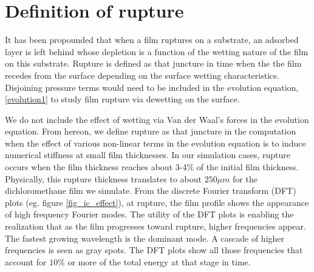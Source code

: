 \documentclass[a4paper,12pt]{article}
\begin{document}


\section{Definition of rupture}
It has been propounded that when a film ruptures on a substrate, an adsorbed layer is left behind whose depletion is a function of the wetting nature\citep{Oron2001a} of the film on this substrate. Rupture is defined as that juncture in time when the the film recedes from the surface depending on the surface wetting characteristics. Disjoining pressure terms would need to be included in the evolution equation, \ref{evolution1} to study film rupture via dewetting on the surface.

We do not include the effect of wetting via Van der Waal's forces in the evolution equation. From hereon, we define rupture as that juncture in the computation when the effect of various non-linear terms in the evolution equation is to induce numerical stiffness at small film thicknesses. In our simulation cases, rupture occurs when the film thickness reaches about 3-4\% of the initial film thickness. Physically, this rupture thickness translates to about $250 \mu m$ for the dichloromethane film we simulate. From the discrete Fourier transform (DFT) plots (eg. figure \ref{fig_ic_effect}), at rupture, the film profile shows the appearance of high frequency Fourier modes. The utility of the DFT plots is enabling the realization that as the film progresses toward rupture, higher frequencies appear. The fastest growing wavelength is the dominant mode. A cascade of higher frequencies is seen as gray spots. The DFT plots show all those frequencies that account for $10\%$ or more of the total energy at that stage in time.
\end{document}
